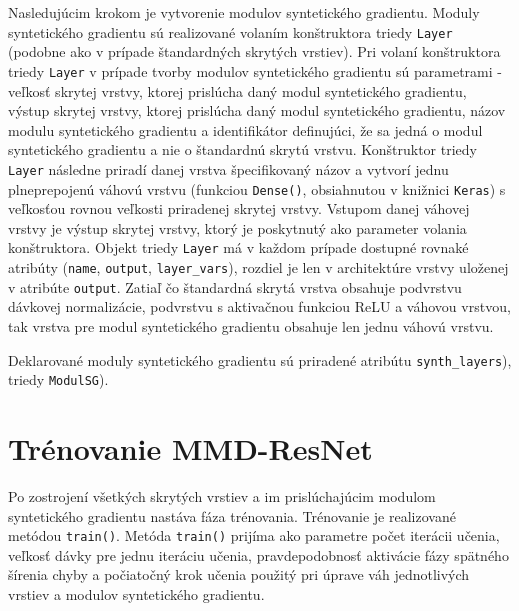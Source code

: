 Nasledujúcim krokom je vytvorenie modulov syntetického gradientu. Moduly syntetického gradientu sú realizované volaním konštruktora triedy \texttt{Layer} (podobne ako v prípade štandardných skrytých vrstiev). Pri volaní konštruktora triedy \texttt{Layer} v prípade tvorby modulov syntetického gradientu sú parametrami - veľkosť skrytej vrstvy, ktorej prislúcha daný modul syntetického gradientu, výstup skrytej vrstvy, ktorej prislúcha daný modul syntetického gradientu, názov modulu syntetického gradientu a identifikátor definujúci, že sa jedná o modul syntetického gradientu a nie o štandardnú skrytú vrstvu. Konštruktor triedy \texttt{Layer} následne priradí danej vrstva špecifikovaný názov a vytvorí jednu plneprepojenú váhovú vrstvu (funkciou \texttt{Dense()}, obsiahnutou v knižnici \texttt{Keras}) s veľkosťou rovnou veľkosti priradenej skrytej vrstvy. Vstupom danej váhovej vrstvy je výstup skrytej vrstvy, ktorý je poskytnutý ako parameter volania konštruktora. Objekt triedy \texttt{Layer} má v každom prípade dostupné rovnaké atribúty (\texttt{name}, \texttt{output}, \texttt{layer_vars}), rozdiel je len v architektúre vrstvy uloženej v atribúte \texttt{output}. Zatiaľ čo štandardná skrytá vrstva obsahuje podvrstvu dávkovej normalizácie, podvrstvu s aktivačnou funkciou ReLU a váhovou vrstvou, tak vrstva pre modul syntetického gradientu obsahuje len jednu váhovú vrstvu.

Deklarované moduly syntetického gradientu sú priradené atribútu \texttt{synth_layers}), triedy \texttt{ModulSG}).

\section{Trénovanie MMD-ResNet}

Po zostrojení všetkých skrytých vrstiev a im prislúchajúcim modulom syntetického gradientu nastáva fáza trénovania. Trénovanie je realizované metódou \texttt{train()}. Metóda \texttt{train()} prijíma ako parametre počet iterácii učenia, veľkosť dávky pre jednu iteráciu učenia, pravdepodobnosť aktivácie fázy spätného šírenia chyby a počiatočný krok učenia použitý pri úprave váh jednotlivých vrstiev a modulov syntetického gradientu.

